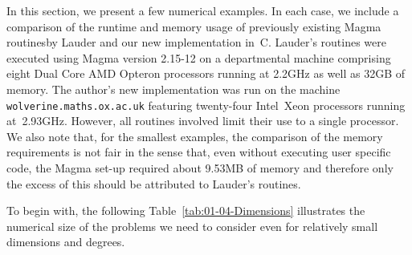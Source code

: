 In this section, we present a few numerical examples.  In each 
case, we include a comparison of the runtime and memory usage of 
previously existing {\sc Magma} routines\footnotemark by Lauder 
and our new implementation in~C.  Lauder's routines were executed 
using {\sc Magma} version {2.15-12} on a departmental machine 
comprising eight Dual Core AMD Opteron processors running at 2.2GHz 
as well as 32GB of memory.  The author's new implementation was 
run on the machine {\tt{wolverine.maths.ox.ac.uk}} featuring twenty-four 
\mbox{Intel Xeon} processors running at~2.93GHz.  However, all 
routines involved limit their use to a single processor.  We also note 
that, for the smallest examples, the comparison of the memory requirements 
is not fair in the sense that, even without executing user specific code, 
the {\sc Magma} set-up required about 9.53MB of memory and therefore 
only the excess of this should be attributed to Lauder's routines.


To begin with, the following Table~\ref{tab:01-04-Dimensions} illustrates the 
numerical size of the problems we need to consider even for relatively small 
dimensions and degrees.

